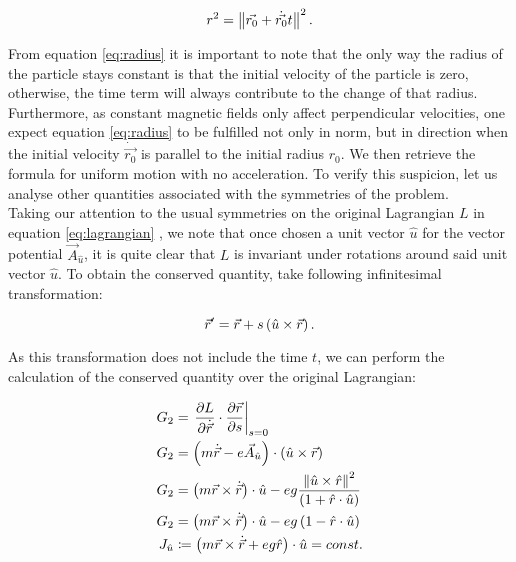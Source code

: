 \begin{equation}
r^2 = \left\lVert \vec{r_0}+\dot{\vec{r_0}}t \right\rVert^2 .
\label{eq:radius}
\end{equation}

From equation \eqref{eq:radius} it is important to note that the only way the radius of the particle stays constant is that the initial velocity of the particle is zero, otherwise, the time term will always contribute to the change of that radius. Furthermore, as constant magnetic fields only affect perpendicular velocities, one expect equation \eqref{eq:radius} to be fulfilled not only in norm, but in direction when the initial velocity $\dot{\vec{r_0}}$ is parallel to the initial radius $r_0$. We then retrieve the formula for uniform motion with no acceleration. To verify this suspicion, let us analyse other quantities associated with the symmetries of the problem.\\

Taking our attention to the usual symmetries on the original Lagrangian $L$ in equation \eqref{eq:lagrangian} , we note that once chosen a unit vector $\hat{u}$ for the vector potential  $\vec{A}_{\hat{u}}$, it is quite clear that $L$ is invariant under rotations around said unit vector $\hat{u}$. To obtain the conserved quantity, take following infinitesimal transformation:

\begin{equation}
\vec{r}' = \vec{r} + s\left( \hat{u}\times\vec{r} \right).
\label{eq:rotinv}
\end{equation}

As this transformation does not include the time $t$, we can perform the calculation of the conserved quantity over the original Lagrangian:

\begin{align*}
G_2 &= \left. \frac{\partial L}{\partial \dot{\vec{r}}}\cdot\frac{\partial \vec{r}}{\partial s} \right|_{s=0}\\
G_2 &= \left( m\dot{\vec{r}} - e\vec{A}_{\hat{u}} \right)\cdot \left( \hat{u}\times\vec{r} \right) \\
G_2 &= \left( m\vec{r}\times\dot{\vec{r}} \right)\cdot\hat{u}-eg\frac{\left\lVert \hat{u}\times\hat{r} \right\rVert^2}{\left( 1+\hat{r}\cdot\hat{u} \right)}\\
G_2 &= \left( m\vec{r}\times\dot{\vec{r}} \right)\cdot\hat{u} -eg\left( 1-\hat{r}\cdot\hat{u} \right)\\
J_{\hat{u}} &\coloneqq \left( {m\vec{r}\times\dot{\vec{r}}}+ eg\hat{r} \right)\cdot\hat{u} = const.
\end{align*}

